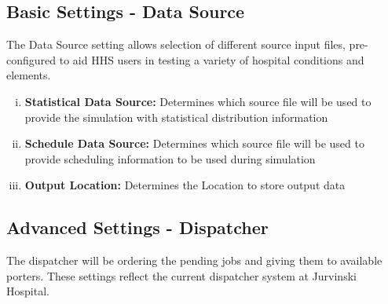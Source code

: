 \documentclass[paper=letter, fontsize=10pt]{scrartcl}
\numberwithin{equation}{section}		%
\numberwithin{figure}{section}			%
\numberwithin{table}{section}				%
\begin{document}
	\subsection{Basic Settings - Data Source}
	The Data Source setting allows selection of different source input files, pre-configured to aid HHS users in testing a variety of hospital conditions and elements. 
	\begin{enumerate}[(i)]
		\item \textbf{Statistical Data Source:} Determines which source file will be used to provide the simulation with statistical distribution information
		\item \textbf{Schedule Data Source:} Determines which source file will be used to provide scheduling information to be used during simulation
		\item \textbf{Output Location:} Determines the Location to store output data
	\end{enumerate}
	
	\subsection{Advanced Settings - Dispatcher}
	The dispatcher will be ordering the pending jobs and giving them to available porters.  These settings reflect the current dispatcher system at Jurvinski Hospital.
	
\end{document}

